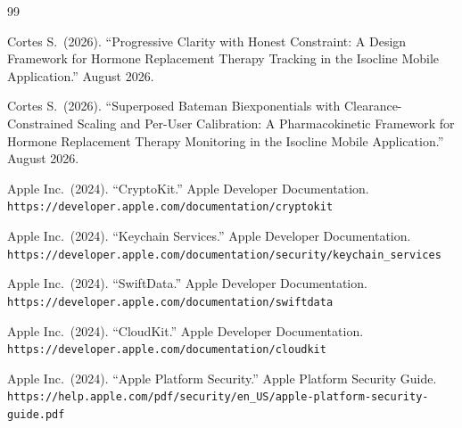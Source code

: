 \documentclass[11pt,a4paper]{article}
\begin{document}
\begin{thebibliography}{99}

Cortes S.\ (2026). ``Progressive Clarity with Honest Constraint: A Design
Framework for Hormone Replacement Therapy Tracking in the Isocline Mobile
Application.'' August 2026.

Cortes S.\ (2026). ``Superposed Bateman Biexponentials with
Clearance-Constrained Scaling and Per-User Calibration: A Pharmacokinetic
Framework for Hormone Replacement Therapy Monitoring in the Isocline Mobile
Application.'' August 2026.

Apple Inc.\ (2024). ``CryptoKit.'' Apple Developer Documentation.
\verb|https://developer.apple.com/documentation/cryptokit|

Apple Inc.\ (2024). ``Keychain Services.'' Apple Developer Documentation.
\verb|https://developer.apple.com/documentation/security/keychain_services|

Apple Inc.\ (2024). ``SwiftData.'' Apple Developer Documentation.
\verb|https://developer.apple.com/documentation/swiftdata|

Apple Inc.\ (2024). ``CloudKit.'' Apple Developer Documentation.
\verb|https://developer.apple.com/documentation/cloudkit|

Apple Inc.\ (2024). ``Apple Platform Security.'' Apple Platform Security
Guide. \verb|https://help.apple.com/pdf/security/en_US/apple-platform-security-guide.pdf|

\end{thebibliography}
\end{document}
